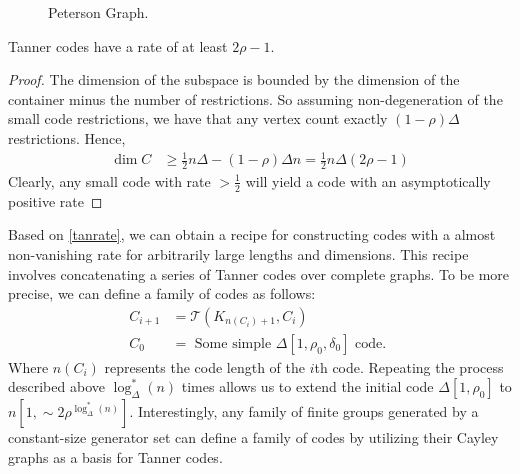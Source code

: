 \begin{center}
  \begin{figure}[H]
  \caption{Peterson Graph.} 
  \label{fig:pet}
\end{figure}
\end{center}

  \begin{lemma}
\label{tanrate} Tanner codes have a rate of at least $2\rho - 1$.
\end{lemma}
  \begin{proof}  The dimension of the subspace is bounded by the dimension of the container minus the number of restrictions. So assuming non-degeneration of the small code restrictions, we have that any vertex count exactly $ \left( 1 - \rho  \right)\Delta $ restrictions. Hence, \begin{equation*}
    \begin{split}
      \dim C & \ge \frac{1}{2}n\Delta - \left( 1-\rho \right)\Delta n = \frac{1}{2}n\Delta\left( 2\rho - 1 \right)  
    \end{split}
  \end{equation*} Clearly, any small code with rate $> \frac{1}{2}$ will yield a code with an asymptotically positive rate \end{proof} 
  Based on \cref{tanrate}, we can obtain a recipe for constructing codes with a almost non-vanishing rate for arbitrarily large lengths and dimensions. This recipe involves concatenating a series of Tanner codes over complete graphs. To be more precise, we can define a family of codes as follows:
  \begin{equation*}
    \begin{split}
      C_{i+1} & = \mathcal{T}\left( K_{n(C_{i}) + 1}, C_{i} \right) \\
      C_{0} &= \text{ Some simple } \Delta[1, \rho_{0}, \delta_{0}] \text{ code. }
    \end{split}
  \end{equation*}
Where $n(C_i)$ represents the code length of the $i$th code. Repeating the process described above $\log_{\Delta}^{*}(n)$ times allows us to extend the initial code $\Delta[1,\rho_{0}]$ to $n[1, \sim 2\rho^{\log_{\Delta}^{*}(n)}]$. Interestingly, any family of finite groups generated by a constant-size generator set can define a family of codes by utilizing their Cayley graphs as a basis for Tanner codes.

